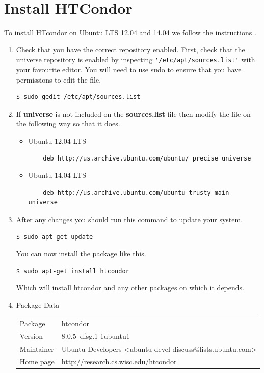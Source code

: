\documentclass{article}
\begin{document}
\section{Install HTCondor}
To install HTcondor on Ubuntu LTS 12.04 and 14.04 we follow the instructions \cite{HTcondor_installation,HTcondor_installation_ubuntu}.
\begin{enumerate}
 \item Check that you have the correct repository enabled.  First, check that the universe repository is enabled by inspecting
 \verb+'/etc/apt/sources.list'+ with your favourite editor. You will need to use sudo to ensure that you have permissions to edit the file.
\begin{verbatim}
$ sudo gedit /etc/apt/sources.list
\end{verbatim}
\item If \textbf{universe} is not included on the \textbf{sources.list} file then modify the file on the following way so that it does.
  \begin{itemize}
    \item Ubuntu 12.04 LTS
    \begin{verbatim}
    deb http://us.archive.ubuntu.com/ubuntu/ precise universe
    \end{verbatim}
    \item Ubuntu 14.04 LTS
    \begin{verbatim}
    deb http://us.archive.ubuntu.com/ubuntu trusty main universe
    \end{verbatim}
  \end{itemize}
\item After any changes you should run this command to update your system.
\begin{verbatim}
$ sudo apt-get update
\end{verbatim}
You can now install the package like this.
\begin{verbatim}
$ sudo apt-get install htcondor
\end{verbatim}
Which will install htcondor and any other packages on which it depends.
\item Package Data
\begin{center}
\begin{tabular}{|l|l|} \hline
Package	& htcondor\\
Version	 & 8.0.5~dfsg.1-1ubuntu1 \\
Maintainer &	Ubuntu Developers <ubuntu-devel-discuss@lists.ubuntu.com>\\
Home page &	http://research.cs.wisc.edu/htcondor\\

\end{tabular}
\end{center}
\end{enumerate}
\end{document}
